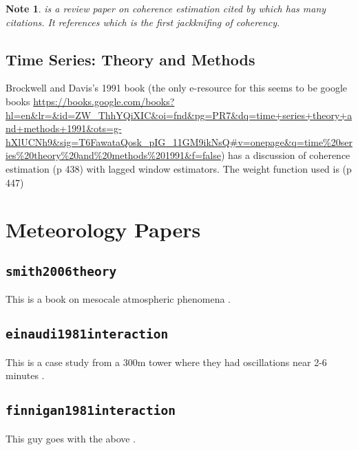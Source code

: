 \documentclass{article}
\newtheorem{note}{Note}
\begin{document}
  \begin{note}
  \cite{carter87} is a review paper on coherence estimation cited by \cite{TC91} which has \emph{many} citations. 
  It references \cite{lee83} which is the first jackknifing of coherency. 
  \end{note}

  \subsection{Time Series: Theory and Methods}
  Brockwell and Davis's 1991 book (the only e-resource for this seems to be google
books
\url{https://books.google.com/books?hl=en&lr=&id=ZW_ThhYQiXIC&oi=fnd&pg=PR7&dq=time+series+theory+and+methods+1991&ots=g-hXlUCNh9&sig=T6FawataQosk_pIG_11GM9ikNsQ#v=onepage&q=time%20series%20theory%20and%20methods%201991&f=false})
has a discussion of coherence estimation (p 438) with lagged window estimators. The
weight function used is (p 447)

\printbibliography[heading=subbibliography,segment=\therefsegment]

\clearpage

\section{Meteorology Papers}

  \subsection{ \texttt{smith2006theory} }
  This is a book on mesocale atmospheric phenomena \cite{smith2006theory}.

  \subsection{ \texttt{einaudi1981interaction}}
  This is a case study from a 300m tower where they had oscillations near 2-6 minutes
\cite{einaudi1981interaction}.

  \subsection{ \texttt{finnigan1981interaction}}
  This guy goes with the above \cite{finnigan1981interaction}.

\printbibliography[heading=subbibliography,segment=\therefsegment]
\end{document}
